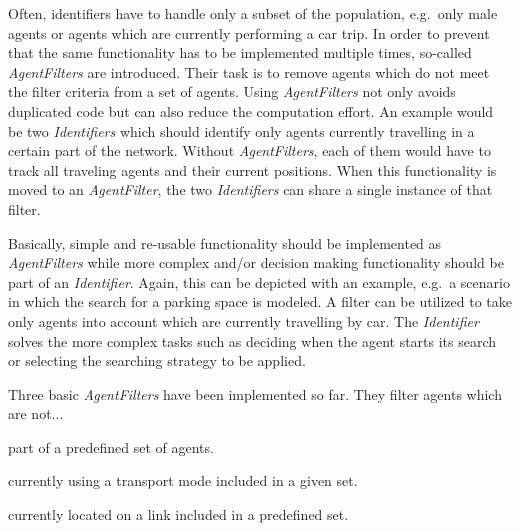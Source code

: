 
Often, identifiers have to handle only a subset of the population, e.g.~only male agents or agents which are currently performing a car trip. In order to prevent that the same functionality has to be implemented multiple times, so-called \textit{AgentFilters} are introduced. Their task is to remove agents which do not meet the filter criteria from a set of agents. Using \textit{AgentFilters} not only avoids duplicated code but can also reduce the computation effort. An example would be two \textit{Identifiers} which should identify only agents currently travelling in a certain part of the network. Without \textit{AgentFilters}, each of them would have to track all traveling agents and their current positions. When this functionality is moved to an \textit{AgentFilter}, the two \textit{Identifiers} can share a single instance of that filter.


Basically, simple and re-usable functionality should be implemented as \textit{AgentFilters} while more complex and/or decision making functionality should be part of an \textit{Identifier}. Again, this can be depicted with an example, e.g.\ a scenario in which the search for a parking space is modeled. A filter can be utilized to take only agents into account which are currently travelling by car. The \textit{Identifier} solves the more complex tasks such as deciding when the agent starts its search or selecting the searching strategy to be applied.


Three basic \emph{AgentFilters} have been implemented so far. They filter agents which are not...
\begin{compactitem}
    \item part of a predefined set of agents.
    \item currently using a transport mode included in a given set.
    \item currently located on a link included in a predefined set.
\end{compactitem}


